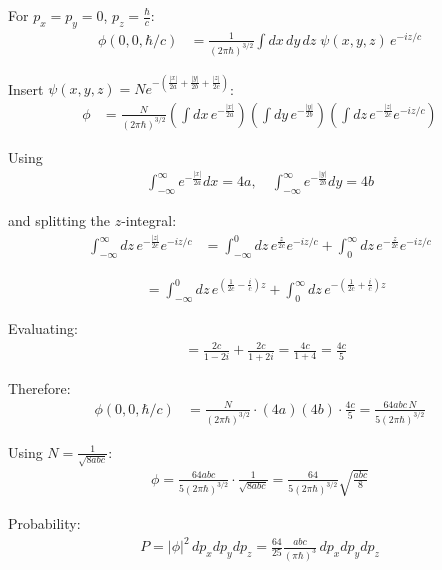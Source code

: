 \documentclass[11pt,a4paper]{scrartcl}
\begin{document}
\begin{enumerate}[label=(\alph*)]
\begin{calculationbox}
        For $p_x = p_y = 0$, $p_z = \frac{\hbar}{c}$:
        \begin{align*}
            \phi(0,0,\hbar/c)
            &= \frac{1}{(2\pi\hbar)^{3/2}} \int dx\,dy\,dz \; \psi(x,y,z)\, e^{-i z / c}
        \end{align*}

        Insert $\psi(x,y,z) = N e^{-\left(\frac{|x|}{2a} + \frac{|y|}{2b} + \frac{|z|}{2c}\right)}$:
        \begin{align*}
            \phi 
            &= \frac{N}{(2\pi\hbar)^{3/2}} 
            \left( \int dx\, e^{-\frac{|x|}{2a}} \right)
            \left( \int dy\, e^{-\frac{|y|}{2b}} \right)
            \left( \int dz\, e^{-\frac{|z|}{2c}} e^{-i z / c} \right)
        \end{align*}

        Using
        \begin{align*}
            \int_{-\infty}^{\infty} e^{-\frac{|x|}{2a}} dx = 4a, 
            \quad 
            \int_{-\infty}^{\infty} e^{-\frac{|y|}{2b}} dy = 4b
        \end{align*}

        and splitting the $z$-integral:
        \begin{align*}
            \int_{-\infty}^{\infty} dz\, e^{-\frac{|z|}{2c}} e^{-i z / c}
            &= \int_{-\infty}^{0} dz\, e^{\frac{z}{2c}} e^{-i z / c}
            + \int_{0}^{\infty} dz\, e^{-\frac{z}{2c}} e^{-i z / c}
        \end{align*}

        \begin{align*}
            &= \int_{-\infty}^{0} dz\, e^{\left(\frac{1}{2c} - \frac{i}{c}\right) z}
            + \int_{0}^{\infty} dz\, e^{-\left(\frac{1}{2c} + \frac{i}{c}\right) z}
        \end{align*}

        Evaluating:
        \begin{align*}
            &= \frac{2c}{1 - 2i} + \frac{2c}{1 + 2i}
            = \frac{4c}{1 + 4}
            = \frac{4c}{5}
        \end{align*}

        Therefore:
        \begin{align*}
            \phi(0,0,\hbar/c)
            &= \frac{N}{(2\pi\hbar)^{3/2}} \cdot (4a)(4b)\cdot \frac{4c}{5}
            = \frac{64 abc\, N}{5 (2\pi\hbar)^{3/2}}
        \end{align*}

        Using $N = \frac{1}{\sqrt{8abc}}$:
        \begin{align*}
            \phi = \frac{64 abc}{5 (2\pi\hbar)^{3/2}} \cdot \frac{1}{\sqrt{8abc}}
            = \frac{64}{5 (2\pi\hbar)^{3/2}} \sqrt{\frac{abc}{8}}
        \end{align*}

        Probability:
        \begin{align*}
            P = |\phi|^2\, dp_x dp_y dp_z
            = \frac{64}{25} \frac{abc}{(\pi \hbar)^3} \, dp_x dp_y dp_z
        \end{align*}
    \end{calculationbox}
\end{enumerate}
\end{document}
